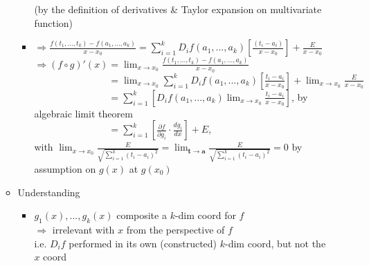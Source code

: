 \begin{itemize}
\begin{itemize}
\begin{itemize}
		(by the definition of derivatives \& Taylor expansion on multivariate function)
		\item $\displaystyle \Rightarrow \frac{f(t_1,...,t_k)-f(a_1,...,a_k)}{x-x_0} = \sum_{i=1}^k D_if(a_1,...,a_k)[\frac{(t_i-a_i)}{x-x_0}] + \frac{E}{x-x_0}$ \\
		$\displaystyle \Rightarrow (f\circ g)'(x) = \lim_{x\rightarrow x_0}\frac{f(t_1,...,t_k)-f(a_1,...,a_k)}{x-x_0}$ \\ 
		$\displaystyle \phantom{\Rightarrow (f\circ g)'(x)} = \lim_{x\rightarrow x_0} \sum_{i=1}^k D_if(a_1,...,a_k)[\frac{t_i-a_i}{x-x_0}] + \lim_{x\rightarrow x_0} \frac{E}{x-x_0}$ \\
		$\displaystyle \phantom{\Rightarrow (f\circ g)'(x)} = \sum_{i=1}^k \left[ D_if(a_1,...,a_k) \lim_{x\rightarrow x_0}\frac{t_i-a_i}{x-x_0} \right]$, by algebraic limit theorem \\
		$\displaystyle \phantom{\Rightarrow (f\circ g)'(x)} = \sum_{i=1}^k \left[ \frac{\partial f}{\partial g_i}\cdot\frac{d g_i}{dx} \right] + E$, \\
		with ${\displaystyle\lim_{x\rightarrow x_0}}\frac{E}{\sqrt{\sum_{i=1}^k (t_i-a_i)^2}} = {\displaystyle\lim_{\mathbf t\rightarrow \mathbf a}} \frac{E}{\sqrt{\sum_{i=1}^k (t_i-a_i)^2}} = 0$ by assumption on $g(x)$ at $g(x_0)$
		\end{itemize}
	\item Understanding
		\begin{itemize}
		\item $g_1(x), ..., g_k(x)$ composite a $k$-dim coord for $f$ \\
		$\Rightarrow$ irrelevant with $x$ from the perspective of $f$ \\
		i.e. $D_if$ performed in its own (constructed) $k$-dim coord, but not the $x$ coord

\end{itemize}
\end{itemize}
\end{itemize}
